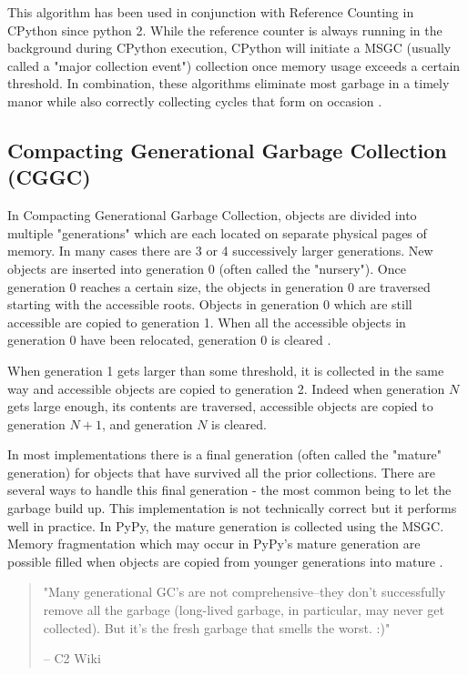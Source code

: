 \documentclass{article}
\begin{document}
This algorithm has been used in conjunction with Reference Counting in CPython since python 2.  While the reference counter is always running in the background during CPython execution, CPython will initiate a MSGC (usually called a "major collection event") collection once memory usage exceeds a certain threshold.  In combination, these algorithms eliminate most garbage in a timely manor while also correctly collecting cycles that form on occasion \cite{cpython3-doc}.  

\subsection{Compacting Generational Garbage Collection (CGGC)}\label{sec:CGGC}

In Compacting Generational Garbage Collection, objects are divided into multiple "generations" which are each located on separate physical pages of memory.  In many cases there are 3 or 4 successively larger generations.  New objects are inserted into generation 0 (often called the "nursery").  Once generation 0 reaches a certain size, the objects in generation 0 are traversed starting with the accessible roots.  Objects in generation 0 which are still accessible are copied to generation 1.  When all the accessible objects in generation 0 have been relocated, generation 0 is cleared \cite{GC-continuum}.  

When generation 1 gets larger than some threshold, it is collected in the same way and accessible objects are copied to generation 2.  Indeed when generation $N$ gets large enough, its contents are traversed, accessible objects are copied to generation $N+1$, and generation $N$ is cleared.

In most implementations there is a final generation (often called the "mature" generation) for objects that have survived all the prior collections.  There are several ways to handle this final generation - the most common being to let the garbage build up.  This implementation is not technically correct but it performs well in practice.  In PyPy, the mature generation is collected using the MSGC.  Memory fragmentation which may occur in PyPy's mature generation are possible filled when objects are copied from younger generations into mature \cite{pypy-doc}.  

\begin{quotation}
    "Many generational GC's are not comprehensive--they don't successfully remove all the garbage (long-lived garbage, in particular, may never get collected). But it's the fresh garbage that smells the worst. :)"

    -- C2 Wiki\cite{C2}
\end{quotation}
\end{document}
